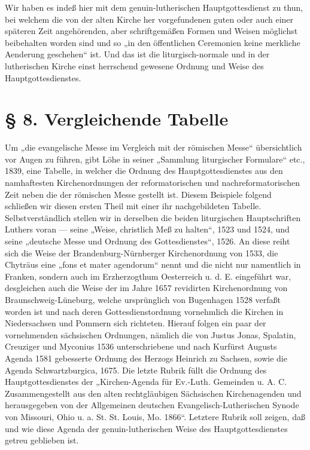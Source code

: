 Wir haben es indeß hier mit dem genuin-lutherischen Hauptgottesdienst zu thun, bei welchem die von der alten Kirche her vorgefundenen guten oder auch einer späteren Zeit angehörenden, aber schriftgemäßen Formen und Weisen möglichst beibehalten worden sind und so „in den öffentlichen Ceremonien keine merkliche Aenderung geschehen“ ist. Und das ist die liturgisch-normale und in der lutherischen Kirche einst herrschend gewesene Ordnung und Weise des Hauptgottesdienstes.

\chapter{§ 8. Vergleichende Tabelle}


Um „die evangelische Messe im Vergleich mit der römischen Messe“ übersichtlich vor Augen zu führen, gibt Löhe in seiner „Sammlung liturgischer Formulare“ etc., 1839, eine Tabelle, in welcher die Ordnung des Hauptgottesdienstes aus den namhaftesten Kirchenordnungen der reformatorischen und nachreformatorischen Zeit neben die der römischen Messe gestellt ist. Diesem Beispiele folgend schließen wir diesen ersten Theil mit einer ihr nachgebildeten Tabelle. Selbstverständlich stellen wir in derselben die beiden liturgischen Hauptschriften Luthers voran — seine „Weise, christlich Meß zu halten“, 1523 und 1524, und seine „deutsche Messe und Ordnung des Gottesdienstes“, 1526. An diese reiht sich die Weise der Brandenburg-Nürnberger Kirchenordnung von 1533, die Chyträus eine „fons et mater agendorum“ nennt und die nicht nur namentlich in Franken, sondern auch im Erzherzogthum Oesterreich u. d. E. eingeführt war, desgleichen auch die Weise der im Jahre 1657 revidirten Kirchenordnung von Braunschweig-Lüneburg, welche ursprünglich von Bugenhagen 1528 verfaßt worden ist und nach deren Gottesdienstordnung vornehmlich die Kirchen in Niedersachsen und Pommern sich richteten. Hierauf folgen ein paar der vornehmenden sächsischen Ordnungen, nämlich die von Justus Jonas, Spalatin, Creuziger und Myconius 1536 unterschriebene und nach Kurfürst Augusts Agenda 1581 gebesserte Ordnung des Herzogs Heinrich zu Sachsen, sowie die Agenda Schwartzburgica, 1675. Die letzte Rubrik füllt die Ordnung des Hauptgottesdienstes der „Kirchen-Agenda für Ev.-Luth. Gemeinden u. A. C. Zusammengestellt aus den alten rechtgläubigen Sächsischen Kirchenagenden und herausgegeben von der Allgemeinen deutschen Evangelisch-Lutherischen Synode von Missouri, Ohio u. a. St. St. Louis, Mo. 1866“. Letztere Rubrik soll zeigen, daß und wie diese Agenda der genuin-lutherischen Weise des Hauptgottesdienstes getreu geblieben ist.

